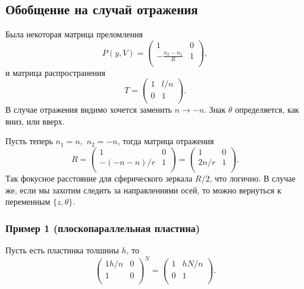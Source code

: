 \subsection*{Обобщение на случай отражения}

Была некоторая матрица преломления
\begin{equation*}
     P(y, V) = \begin{pmatrix}
        1 & 0 \\
        -\frac{n_2-n_1}{R} & 1 \\
    \end{pmatrix},
\end{equation*}
и матрица распространения
\begin{equation*}
    T = \begin{pmatrix}
        1 & l/n \\
        0 & 1 \\
    \end{pmatrix}.
\end{equation*}
В случае отражения видимо хочется заменить $n \to -n$. Знак $\theta$ определяется, как вниз, или вверх.

Пусть теперь $n_1=n,$ $n_2=-n$, тогда матрица отражения
\begin{equation*}
    R = \begin{pmatrix}
        1 & 0 \\
        -(-n-n)/r & 1 \\
    \end{pmatrix} = \begin{pmatrix}
        1 & 0 \\
        2n/r & 1 \\
    \end{pmatrix}.
\end{equation*}
Так фокусное расстояние для сферического зеркала $R/2$, что логично. В случае же, если мы захотим следить за направлениями осей, то можно вернуться к переменным $\{z, \theta\}$. 


\subsubsection*{Пример 1 (плоскопараллельная пластина)}

Пусть есть пластинка толшины $h$, то
\begin{equation*}
    \begin{pmatrix}
        1h/n & 0 \\
        1 & 0 \\
    \end{pmatrix}^N = 
    \begin{pmatrix}
        1 & hN/n \\
        0 & 1 \\
    \end{pmatrix}.
\end{equation*}



